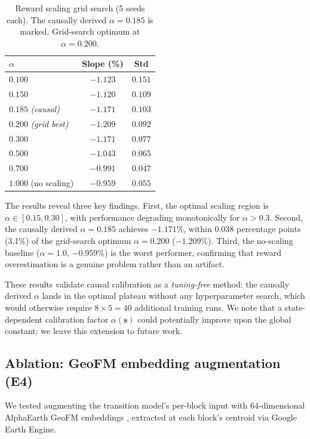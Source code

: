 \documentclass[11pt]{article}
\begin{document}
\begin{table}[htbp]
\centering
\caption{Reward scaling grid search (5 seeds each). The causally derived $\alpha = 0.185$ is marked. Grid-search optimum at $\alpha = 0.200$.}
\label{tab:grid}
\begin{tabular}{lcc}
\toprule
$\alpha$ & Slope (\%) & Std \\
\midrule
$0.100$                          & $-1.123$ & $0.151$ \\
$0.150$                          & $-1.120$ & $0.109$ \\
$0.185$ \textit{(causal)}        & $-1.171$ & $0.103$ \\
$\mathbf{0.200}$ \textit{(grid best)} & $\mathbf{-1.209}$ & $\mathbf{0.092}$ \\
$0.300$                          & $-1.171$ & $0.077$ \\
$0.500$                          & $-1.043$ & $0.065$ \\
$0.700$                          & $-0.991$ & $0.047$ \\
$1.000$ (no scaling)             & $-0.959$ & $0.055$ \\
\bottomrule
\end{tabular}
\end{table}

The results reveal three key findings. First, the optimal scaling region is $\alpha \in [0.15, 0.30]$, with performance degrading monotonically for $\alpha > 0.3$. Second, the causally derived $\alpha = 0.185$ achieves $-1.171\%$, within 0.038 percentage points (3.1\%) of the grid-search optimum $\alpha = 0.200$ ($-1.209\%$). Third, the no-scaling baseline ($\alpha = 1.0$, $-0.959\%$) is the worst performer, confirming that reward overestimation is a genuine problem rather than an artifact.

These results validate causal calibration as a \textit{tuning-free} method: the causally derived $\alpha$ lands in the optimal plateau without any hyperparameter search, which would otherwise require $8 \times 5 = 40$ additional training runs. We note that a state-dependent calibration factor $\alpha(\mathbf{s})$ could potentially improve upon the global constant; we leave this extension to future work.

\subsection{Ablation: GeoFM embedding augmentation (E4)}

We tested augmenting the transition model's per-block input with 64-dimensional AlphaEarth GeoFM embeddings \citep{brown2025alphaearth}, extracted at each block's centroid via Google Earth Engine.
\end{document}
